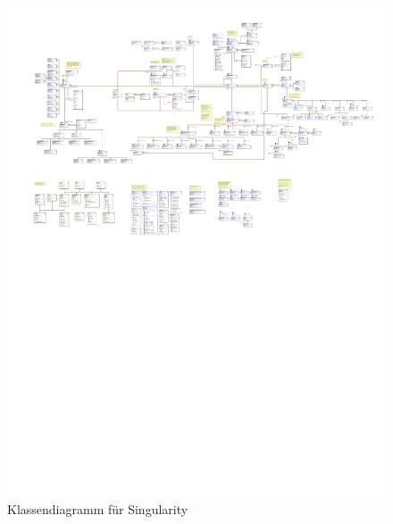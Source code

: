 \documentclass[12pt]{article}
\begin{document}
\newpage
\begin{figure}[h!]
    \centering
    \includegraphics[trim={0 14cm 0 0}, clip, width=\linewidth]{res/class.pdf}
    \caption{Klassendiagramm für Singularity}
\end{figure}
\end{document}
